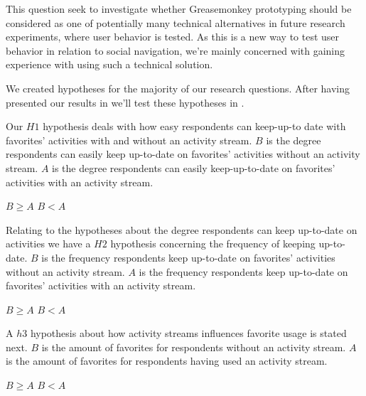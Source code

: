 This question seek to investigate whether Greasemonkey prototyping should be
considered as one of potentially many technical alternatives in future
research experiments, where user behavior is tested. As this is a new way
to test user behavior in relation to social navigation, we're mainly concerned
with gaining experience with using such a technical solution.

\parabreak

We created hypotheses for the majority of our research questions. After having
presented our results in 
 we'll test these hypotheses in
.

\addline

Our $H1$ hypothesis deals with how easy respondents can keep-up-to
date with favorites' activities with and without an 
activity stream.
$B$ is the degree respondents can easily keep up-to-date on
favorites' activities without an activity stream. $A$ is the degree
respondents can easily keep-up-to-date on favorites' activities  with
an activity stream.
\begin{items}
   $B \geq A$
   $B < A$
\end{items}

Relating to the hypotheses about the degree respondents can keep
up-to-date on activities we have a $H2$ hypothesis concerning
the frequency of keeping up-to-date.
$B$ is the frequency respondents keep up-to-date on favorites' activities
without an activity stream. $A$ is the frequency respondents keep
up-to-date on favorites' activities with an activity stream.
\begin{items}
   $B \geq A$
   $B < A$
\end{items}

A $h3$ hypothesis about how activity streams influences favorite usage is
stated next.
$B$ is the amount of favorites for respondents without an activity stream.
$A$ is the amount of favorites for respondents having used an activity
stream.
\begin{items}
   $B \geq A$
   $B < A$
\end{items}
